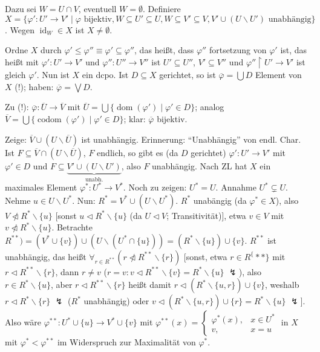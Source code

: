 \documentclass[headsepline=true,DIV=11]{scrartcl}
\theoremstyle{definition}
\renewcommand{\bar}[1]{\overline{#1}}
\newcommand{\dom}{\operatorname{dom}}
\newcommand{\codom}{\operatorname{codom}}
\newcommand{\nlhd}{\ntriangleleft} %
\begin{document}
Dazu sei $W=U\cap V$, eventuell $W=\emptyset$. Definiere $X=\{\varphi':U'\rightarrow V'\mid \varphi\mbox{ bijektiv}, W\subseteq U'\subseteq U,
W\subseteq V'\subseteq V, V'\cup(U\backslash U')\mbox{ unabhängig}\}$. Wegen $\operatorname{id}_W\in X$ ist $X\neq\emptyset$.

Ordne $X$ durch $\varphi'\le\varphi''\equiv \varphi'\subseteq\varphi''$, das heißt, dass $\varphi''$ fortsetzung von $\varphi'$ ist, das heißt mit
$\varphi':U'\rightarrow V'$ und $\varphi'':U''\rightarrow V''$ ist $U'\subseteq U''$, $V'\subseteq V''$ und $\varphi''\upharpoonright U'\rightarrow
V'$ ist gleich $\varphi'$. Nun ist $X$ ein dcpo. Ist $D\subseteq X$ gerichtet, so ist $\bar{\varphi}=\bigcup D$ Element von $X$ (!); haben: $\bar{\varphi}=\bigvee D$.

Zu (!): $\bar{\varphi}:\bar{U}\rightarrow\bar{V}$ mit $\bar{U}=\bigcup\{\dom(\varphi')\mid \varphi'\in D\}$; analog
$\bar{V}=\bigcup\{\codom(\varphi')\mid \varphi'\in D\}$; klar: $\bar{\varphi}$ bijektiv.

Zeige: $\bar{V}\cup(U\backslash\bar{U})$ ist unabhängig. Erinnerung: ``Unabhängig'' von endl. Char. Ist $F\subseteq \bar{V}\cap(U\backslash\bar{U})$,
$F$ endlich, so gibt es (da $D$ gerichtet) $\varphi':U'\rightarrow V'$ mit $\varphi'\in D$ und $F\subseteq \underbrace{V'\cup(U\backslash
  U')}_{\mbox{unabh.}}$, also $F$ unabhängig. Nach ZL hat $X$ ein maximales Element $\varphi^*:U^*\rightarrow V^*$. Noch zu zeigen: $U^*=U$. Annahme
$U^*\subsetneq U$. Nehme $u\in U\backslash U^*$. Nun: $R^*=V^*\cup(U\backslash U^*)$. $R^*$ unabängig (da $\varphi^*\in X$), also $V\nlhd
R^*\backslash\{u\}$ [sonst $u\lhd R^*\backslash\{u\}$ (da $U\lhd V$; Transitivität)], etwa $v\in V$ mit $v\nlhd R^*\backslash\{u\}$. Betrachte
$R^{**})=(V^*\cup\{v\})\cup(U\backslash(U^*\cap\{u\}))=(R^*\backslash\{u\})\cup\{v\}$. $R^{**}$ ist unabhängig, das heißt $\forall_{r\in
  R^{**}}(r\nlhd R^{**}\backslash\{r\})$ [sonst, etwa $r\in R^\{**\}$ mit $r\lhd R^{**}\backslash\{r\}$, dann $r\neq v$ ($r=v: v\lhd
  R^{**}\backslash\{v\}=R^*\backslash\{u\}$ $\lightning$), also $r\in R^*\backslash\{u\}$, aber $r\lhd R^{**}\backslash\{r\}$ heißt damit $r\lhd
  (R^*\backslash\{u,r\})\cup\{v\}$, weshalb $r\lhd R^*\backslash\{r\}$ $\lightning$ ($R^*$ unabhängig) oder
  $v\lhd(R^*\backslash\{u,r\})\cup\{r\}=R^*\backslash\{u\}$ $\lightning$]. Also wäre $\varphi^{**}:U^*\cup\{u\}\rightarrow V^*\cup\{v\}$ mit
$\varphi^{**}(x) = \left\{ \begin{array}{rl} \varphi^*(x),& x\in U^* \\ v,& x = u \end{array}\right.$ in $X$ mit $\varphi^* < \varphi^{**}$ im
Widerspruch zur Maximalität von $\varphi^*$.
\end{document}
